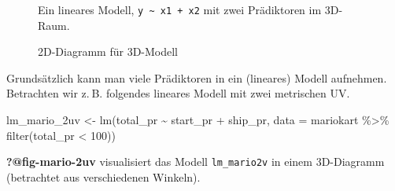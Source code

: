 \documentclass[
  a4paper,
]{scrbook}
\newenvironment{Shaded}{\begin{snugshade}}{\end{snugshade}}
\newcommand{\AttributeTok}[1]{\textcolor[rgb]{0.40,0.45,0.13}{#1}}
\newcommand{\DecValTok}[1]{\textcolor[rgb]{0.68,0.00,0.00}{#1}}
\newcommand{\FunctionTok}[1]{\textcolor[rgb]{0.28,0.35,0.67}{#1}}
\newcommand{\NormalTok}[1]{\textcolor[rgb]{0.00,0.23,0.31}{#1}}
\newcommand{\OtherTok}[1]{\textcolor[rgb]{0.00,0.23,0.31}{#1}}
\newcommand{\SpecialCharTok}[1]{\textcolor[rgb]{0.37,0.37,0.37}{#1}}
\theoremstyle{definition}
\theoremstyle{definition}
\theoremstyle{definition}
\theoremstyle{remark}
\begin{document}
\begin{figure}
\begin{minipage}{0.33\linewidth}
\end{minipage}%

\caption{\label{fig-3d-regr-statisch}Ein lineares Modell,
\texttt{y\ \textasciitilde{}\ x1\ +\ x2} mit zwei Prädiktoren im
3D-Raum.}

\end{figure}%

\begin{figure}


\caption{\label{fig-3d-regr-2d}2D-Diagramm für 3D-Modell}

\end{figure}%

Grundsätzlich kann man viele Prädiktoren in ein (lineares) Modell
aufnehmen. Betrachten wir z. B. folgendes lineares Modell mit zwei
metrischen UV.

\begin{Shaded}
\begin{Highlighting}[]
\NormalTok{lm\_mario\_2uv }\OtherTok{\textless{}{-}} \FunctionTok{lm}\NormalTok{(total\_pr }\SpecialCharTok{\textasciitilde{}}\NormalTok{ start\_pr }\SpecialCharTok{+}\NormalTok{ ship\_pr, }\AttributeTok{data =}\NormalTok{ mariokart }\SpecialCharTok{\%\textgreater{}\%} \FunctionTok{filter}\NormalTok{(total\_pr }\SpecialCharTok{\textless{}} \DecValTok{100}\NormalTok{))}
\end{Highlighting}
\end{Shaded}

\textbf{?@fig-mario-2uv} visualisiert das Modell \texttt{lm\_mario2v} in
einem 3D-Diagramm (betrachtet aus verschiedenen Winkeln).
\end{document}
